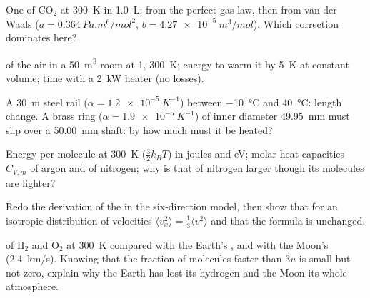 \begin{exercise}[$\star\star$]\label{exo:b1:kinetic-theory:7}
One  of CO$_2$ at \qty{300}{K} in \qty{1.0}{L}:  from the
perfect-gas law, then from van der Waals ($a = \qty{0.364}{Pa.m^6/mol^2}$,
$b = \qty{4.27e-5}{m^3/mol}$). Which correction dominates here?
\end{exercise}

\begin{exercise}[$\star\star$]\label{exo:b1:kinetic-theory:8}
 of the air in a \qty{50}{m^3} room at \qty{1}{},
\qty{300}{K}; energy to warm it by \qty{5}{K} at constant volume; time
with a \qty{2}{kW} heater (no losses).
\end{exercise}

\begin{exercise}[$\star\star$]\label{exo:b1:kinetic-theory:9}
A \qty{30}{m} steel rail ($\alpha = \qty{1.2e-5}{K^{-1}}$) between
\qty{-10}{\degreeCelsius} and \qty{40}{\degreeCelsius}: length change.
A brass ring ($\alpha = \qty{1.9e-5}{K^{-1}}$) of inner diameter
\qty{49.95}{mm} must slip over a \qty{50.00}{mm} shaft: by how much must
it be heated?
\end{exercise}

\begin{exercise}[$\star\star\star$]\label{exo:b1:kinetic-theory:10}
Energy per molecule at \qty{300}{K} ($\tfrac32 k_BT$) in joules and eV;
molar heat capacities $C_{V,m}$ of argon and of nitrogen; why is that of
nitrogen larger though its molecules are lighter?
\end{exercise}

\begin{exercise}[$\star\star\star$]\label{exo:b1:kinetic-theory:11}
Redo the derivation of the  in the six-direction model,
then show that for an isotropic distribution of velocities $\langle v_x^2\rangle
= \tfrac13\langle v^2\rangle$ and that the  formula is unchanged.
\end{exercise}

\begin{exercise}[$\star\star\star$]\label{exo:b1:kinetic-theory:12}
 of H$_2$ and O$_2$ at \qty{300}{K} compared with
the Earth's , and with the Moon's (\qty{2.4}{km/s}).
Knowing that the fraction of molecules faster than $3u$ is small but not
zero, explain why the Earth has lost its hydrogen and the Moon its whole
atmosphere.
\end{exercise}

